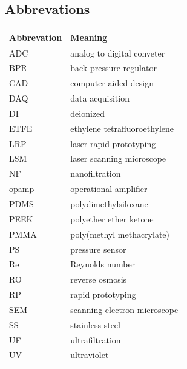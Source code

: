 \documentclass[master,         %
               12pt,           %
               twoside,        %
               BCOR10mm,       %
               ngerman,english%
							 ]{IMTEKda}
\newcommand{\tabheadfont}[1]{\textbf{#1}} %
\newlength\pf
\begin{document}
\begin{nomenclature}
\section*{Abbrevations}
\begin{longtable}[l]{p{}p{}}
  \tabheadfont{Abbrevation}&\tabheadfont{Meaning}\\\midrule\endhead
	ADC & analog to digital conveter \\
	BPR & back pressure regulator \\
	CAD & computer-aided design \\
	DAQ & data acquisition \\
	DI & deionized \\
	ETFE & ethylene tetrafluoroethylene \\
    LRP & laser rapid prototyping \\
	LSM & laser scanning microscope\\
	NF & nanofiltration\\
	opamp & operational amplifier\\
	PDMS & polydimethylsiloxane \\
	PEEK & polyether ether ketone\\
	PMMA & poly(methyl methacrylate)\\
	PS & pressure sensor\\
	Re & Reynolds number\\
	RO & reverse osmosis\\
	RP & rapid prototyping\\
	SEM & scanning electron microscope\\
	SS & stainless steel\\
	UF & ultrafiltration\\
	UV & ultraviolet\\	
\end{longtable}
\end{nomenclature}

\footnotesize

\listoffigures
\listoftables
\normalsize
\mainmatter   %







\end{document}

